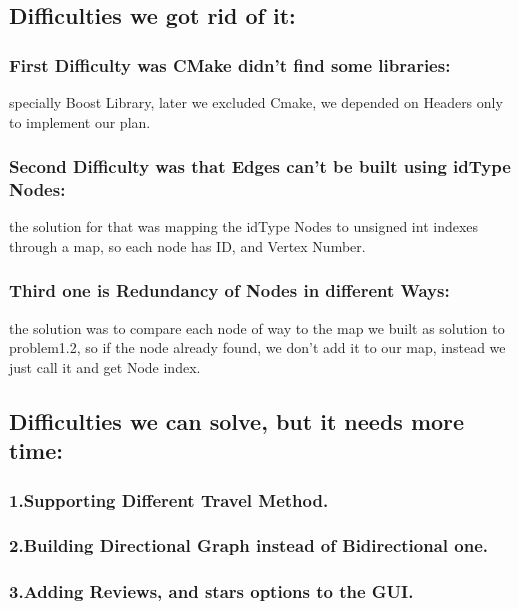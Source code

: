 \documentclass[a4paper, 12pt, english]{book}
\begin{document}
\subsection{Difficulties we got rid of it:} 
\subsubsection{First Difficulty was CMake didn’t find some libraries:}
specially Boost Library, later we excluded Cmake, we depended on Headers only to implement our plan.
\subsubsection{Second Difficulty was that Edges can’t be built using idType Nodes:} the solution for that was mapping the idType Nodes to unsigned int indexes through a map, so each node has ID, and Vertex Number.
\subsubsection{Third one is Redundancy of Nodes in different Ways:} the solution was to compare each node of way to the map we built as solution to problem1.2, so if the node already found, we don’t add it to our map, instead we just call it and get Node index.
\subsection{Difficulties we can solve, but it needs more time:}
\subsubsection{1.Supporting Different Travel Method.}
\subsubsection{2.Building Directional Graph instead of Bidirectional one.}
\subsubsection{3.Adding Reviews, and stars options to the GUI.}
\end{document}
